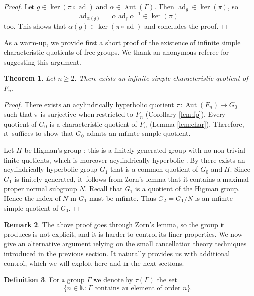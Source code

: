 \documentclass[JEP,XML,SOM,Unicode]{cedram}
\newtheorem{theorem}{Theorem}[section]
\theoremstyle{definition}
\newtheorem{definition}[theorem]{Definition}
\newtheorem{remark}[theorem]{Remark}
\newcommand{\Aut}{\operatorname{Aut}}
\newcommand{\ad}{\operatorname{ad}}
\begin{document}
\begin{proof}
Let $g \in \ker(\pi \circ \ad)$ and $\alpha \in \Aut(\Gamma)$. Then $\ad_g \in \ker(\pi)$, so
\[
\ad_{\alpha(g)} = \alpha \ad_g \alpha^{-1} \in \ker(\pi)
\]
too. This shows that $\alpha(g) \in \ker(\pi \circ \ad)$ and concludes the proof.
\end{proof}

As a warm-up, we provide first a short proof of the existence of infinite simple characteristic quotients of free groups.
We thank an anonymous referee for suggesting this argument.

\begin{theorem}
\label{res: referee statement}
Let $n\geq 2$.
There exists an infinite simple characteristic quotient of~$F_n$.
\end{theorem}

\begin{proof}
There exists an acylindrically hyperbolic quotient $\pi \colon \Aut(F_n) \to G_0$ such that $\pi$ is surjective when restricted to $F_n$ (Corollary \ref{lem:fp}). Every quotient of $G_0$ is a characteristic quotient of $F_n$ (Lemma \ref{lem:char}). Therefore, it~suffices to show that $G_0$ admits an infinite simple quotient.

Let $H$ be Higman's group \cite{higman}: this is a finitely generated group with no non-trivial finite quotients, which is moreover acylindrically hyperbolic \cite[Cor.\,4.26]{MO}.
By \cite[Cor.\,1.6]{hull} there exists an acylindrically hyperbolic group $G_1$ that is a common quotient of $G_0$ and $H$.
Since $G_1$ is finitely generated, it~follows from Zorn's lemma that it contains a maximal proper normal subgroup $N$.
Recall that $G_1$ is a quotient of the Higman group.
Hence the index of $N$ in $G_1$ must be infinite.
Thus $G_2 = G_1/N$ is an infinite simple quotient of $G_0$.
\end{proof}

\begin{remark}
The above proof goes through Zorn's lemma, so the group it produces is not explicit, and it is harder to control its finer properties. We now give an alternative argument relying on the small cancellation theory techniques introduced in the previous section. It naturally provides us with additional control, which we will exploit here and in the next sections.
\end{remark}

\begin{definition}
\label{def:tau}
For a group $\Gamma$ we denote by $\tau(\Gamma)$ the set
\[
\{ n \in \mathbb{N} : \Gamma \text{ contains an element of order } n\}.
\]
\end{definition}
\end{document}
